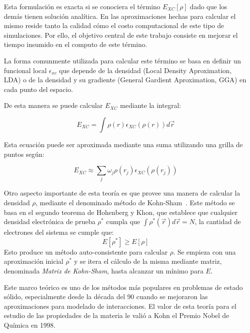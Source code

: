 Esta formulaci\'on es exacta si se conociera el t\'ermino $E_{XC}[\rho]$ dado que los dem\'as tienen soluci\'on anal\'itica. En las aproximaciones hechas para calcular el mismo reside tanto la calidad c\'omo el costo
computacional de este tipo de simulaciones. Por ello, el objetivo central de este trabajo consiste en mejorar el tiempo insumido en el computo de este t\'ermino.

La forma comunmente utilizada para calcular este t\'ermino se basa en definir un funcional local $\epsilon_{xc}$ que depende de la densidad (Local Density Aproximation, LDA) o de la densidad y su gradiente
(General Gardient Aproximation, GGA) en cada punto del espacio.

De esta manera se puede calcular $E_{XC}$ mediante la integral:

\begin{equation}
  E_{XC} = \int \rho(r) \epsilon_{XC}\left( \rho(r) \right ) d\vec{r}
\end{equation}

Esta ecuaci\'on puede ser aproximada mediante una suma utilizando una grilla de puntos seg\'un:

\begin{equation}
    \label{eq:xc}
    E_{XC} \approx \sum_j \omega_j \rho(r_j) \epsilon_{XC} (\rho(r_j))
\end{equation}

Otro aspecto importante de esta teor\'ia es que provee una manera de calcular la densidad $\rho$, mediante el denominado m\'etodo de Kohn-Sham~\cite{KohnSham}.
Este m\'etodo se basa en el segundo teorema de Hohenberg y Khon, que establece que cualquier densidad electr\'onica de prueba $\rho^*$ cumpla que $\int \rho^*(\vec{r}) d\vec{r} = N$, la cantidad de electrones del sistema
se cumple que:
\begin{equation}
    \label{princ_variacional}
    E[\rho^*] \geq E[\rho]
\end{equation}
Esto produce un m\'etodo auto-consistente para calcular $\rho$. Se empieza con una aproximaci\'on inicial $\rho^*$ y se itera el c\'alculo de la misma mediante matriz, denominada \textit{Matriz de Kohn-Sham}, hasta alcanzar un m\'inimo para $E$.

Este marco te\'orico es uno de los m\'etodos m\'as populares en problemas de estado s\'olido, especialmente desde la d\'ecada del 90 cuando se mejoraron las aproximaciones para modelado de interacciones.
El valor de esta teor\'ia para el estudio de las propiedades de la materia le vali\'o a Kohn el Premio Nobel de Qu\'imica en 1998.

